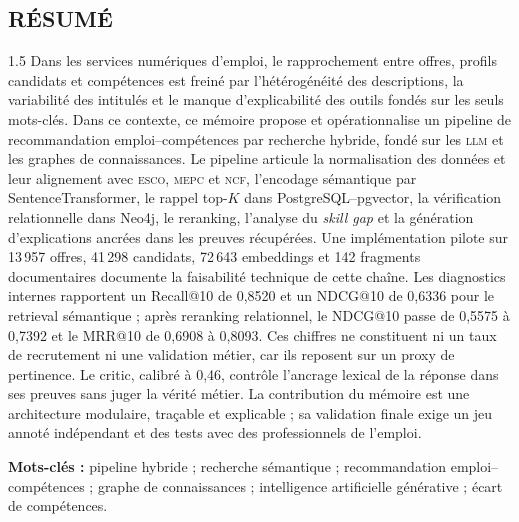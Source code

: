 \documentclass[12pt,twoside]{report}
\newcommand{\ESCO}{\textsc{esco}}
\newcommand{\MEPC}{\textsc{mepc}}
\newcommand{\NCF}{\textsc{ncf}}
\newcommand{\LLM}{\textsc{llm}}
\begin{document}
\begin{singlespace}
\chapter*{RÉSUMÉ}
\begin{spacing}{1.5}
Dans les services numériques d'emploi, le rapprochement entre offres, profils candidats et compétences est freiné par l'hétérogénéité des descriptions, la variabilité des intitulés et le manque d'explicabilité des outils fondés sur les seuls mots-clés. Dans ce contexte, ce mémoire propose et opérationnalise un pipeline de recommandation emploi--compétences par recherche hybride, fondé sur les \LLM{} et les graphes de connaissances. Le pipeline articule la normalisation des données et leur alignement avec \ESCO{}, \MEPC{} et \NCF{}, l'encodage sémantique par SentenceTransformer, le rappel top-$K$ dans PostgreSQL--pgvector, la vérification relationnelle dans Neo4j, le reranking, l'analyse du \textit{skill gap} et la génération d'explications ancrées dans les preuves récupérées. Une implémentation pilote sur 13\,957 offres, 41\,298 candidats, 72\,643 embeddings et 142 fragments documentaires documente la faisabilité technique de cette chaîne. Les diagnostics internes rapportent un Recall@10 de 0,8520 et un NDCG@10 de 0,6336 pour le retrieval sémantique ; après reranking relationnel, le NDCG@10 passe de 0,5575 à 0,7392 et le MRR@10 de 0,6908 à 0,8093. Ces chiffres ne constituent ni un taux de recrutement ni une validation métier, car ils reposent sur un proxy de pertinence. Le critic, calibré à 0,46, contrôle l'ancrage lexical de la réponse dans ses preuves sans juger la vérité métier. La contribution du mémoire est une architecture modulaire, traçable et explicable ; sa validation finale exige un jeu annoté indépendant et des tests avec des professionnels de l'emploi.

\textbf{Mots-clés :} pipeline hybride ; recherche sémantique ; recommandation emploi--compétences ; graphe de connaissances ; intelligence artificielle générative ; écart de compétences.
\end{spacing}



\end{singlespace}
\end{document}
